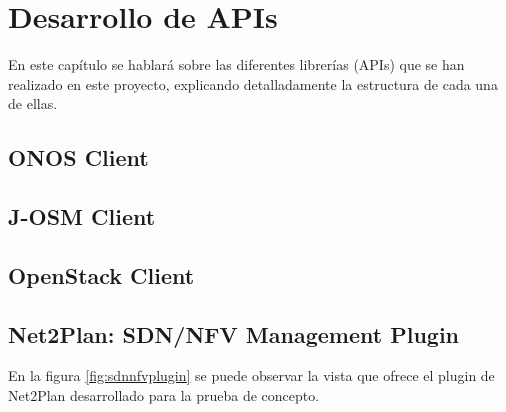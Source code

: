 \chapter{Desarrollo de APIs}

En este capítulo se hablará sobre las diferentes librerías (APIs) que se han realizado en este proyecto, explicando detalladamente la estructura de cada una de ellas.



\section{ONOS Client}
\label{sec:onosclient}

\section{J-OSM Client}
\label{sec:osmclient}

\section{OpenStack Client}
\label{sec:openstackclient}

\section{Net2Plan: SDN/NFV Management Plugin}
\label{sec:nfvplugin}

En la figura \ref{fig:sdnnfvplugin} se puede observar la vista que ofrece el plugin de Net2Plan desarrollado para la prueba de concepto.

\cleardoublepage